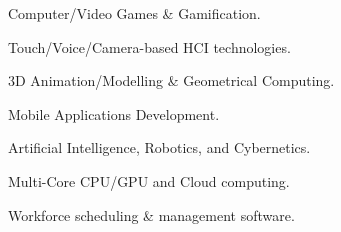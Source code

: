 

\begin{cventries}


  \cventry
    {} 
    {}
    {}
    {}
    {    	
	  \vspace{-1.7cm}
      \begin{multicols}{2}
      \begin{cvitems}
		\item {Computer/Video Games \& Gamification.}      
        \item {Touch/Voice/Camera-based HCI technologies.}
        \item {3D Animation/Modelling \& Geometrical Computing.}
        \item {Mobile Applications Development.}
        \item {Artificial Intelligence, Robotics, and Cybernetics.}
        \item {Multi-Core CPU/GPU and Cloud computing.}
        \item {Workforce scheduling \& management software.}
      \end{cvitems}
	  \end{multicols}
	  \vspace{-0.5cm}
    }

\end{cventries}
